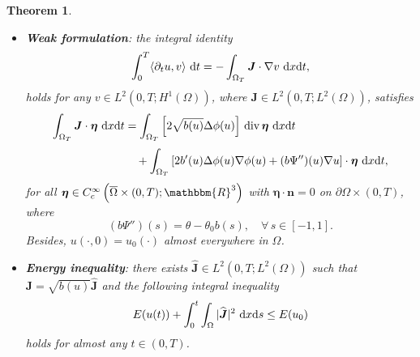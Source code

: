 \documentclass[11pt,  reqno]{amsart}%
\theoremstyle{plain}
\newtheorem{theorem}{Theorem}[section]
\theoremstyle{definition}
\theoremstyle{remark}
\numberwithin{equation}{section}
\def\div{\,\mathrm{div}}
\newcommand{\dx}{\textup{d}x}
\newcommand{\dt}{\textup{d}t}
\newcommand{\ds}{\textup{d}s}
\begin{document}
\begin{theorem}
\begin{itemize}
			\item[(ii)] \textbf{Weak formulation}: the integral identity
            \begin{equation}
                \label{weak formulation}
                \int_0^T \langle \partial_t u, v \rangle \  \dt = -\int_{\Omega_T} \boldsymbol{J} \cdot \nabla v \ \dx \dt,
            \end{equation}
            holds for any $v \in L^2(0,T;H^1(\Omega))$,
            where $\boldsymbol{J} \in L^2(0,T;L^2(\Omega))$, satisfies 
			\begin{align}
			\int_{\Omega_T} \boldsymbol{J} \cdot \boldsymbol{\eta} \ \dx \dt &= \int_{\Omega_T} \left[2\sqrt{b(u)}\Delta \phi(u) \right]\div\,  \boldsymbol{\eta} \ \dx \dt  \notag 
\\[3pt]
& \quad + \int_{\Omega_T}  \left[ 2 b'(u) \Delta \phi(u)\nabla \phi(u) 
+ (b\Psi'')(u) \nabla u \right] \cdot \boldsymbol{\eta} \ \dx \dt, 
\label{J}
			\end{align}
for all $\boldsymbol{\eta} \in C_c^\infty\left( \overline{\Omega} \times (0,T); \mathbbm{R}^3\right)$ with $\boldsymbol{\eta} \cdot \mathbf{n}=0$ on $\partial \Omega \times(0,T)$, where
$$
(b\Psi'')(s)= \theta - \theta_0 b(s), \quad \forall \, s \in [-1,1].
$$		
Besides, $u(\cdot, 0)=u_0(\cdot)$ almost everywhere in $\Omega$. 

        \vspace{0.05cm}
	
\item[(iii)] \textbf{Energy inequality}: there exists $\widehat{\boldsymbol{J}} \in  L^2(0,T;L^2(\Omega))$ such that $\boldsymbol{J} = \sqrt{b(u)} \widehat{\boldsymbol{J}} $ and
			the following integral inequality
			\begin{equation}
			\label{energy-inequality}
			E(u(t)) 
+  \int_0^t \int_\Omega  |\widehat{\boldsymbol{J}}|^2 \ \dx \ds  \leq
E(u_0)
\end{equation}			 
holds for almost any $t \in (0,T)$.   
		\end{itemize}
	\end{theorem}
    
\end{document}
